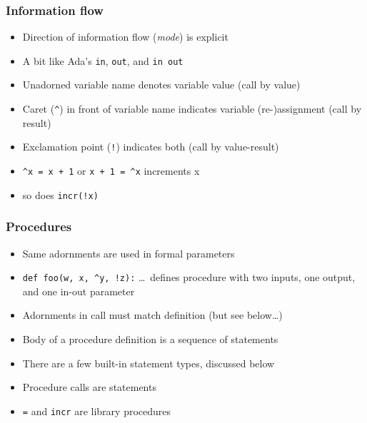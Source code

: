 \documentclass[12pt]{beamer}
\begin{document}
\begin{frame}
\frametitle{Information flow}
\begin{itemize}
\item Direction of information flow (\emph{mode}) is explicit
\item A bit like Ada's \texttt{in}, \texttt{out}, and \texttt{in out}
\item Unadorned variable name denotes variable value (call by value)
\item Caret (\texttt{\^}) in front of variable name indicates
  variable (re-)assignment (call by result)
\item Exclamation point (\texttt{!}) indicates both (call by value-result)
\item \texttt{\^{ }x = x + 1} or \texttt{x + 1 = \^{ }x} increments x
\item so does \texttt{incr(!x)}
\end{itemize}
\end{frame}


\begin{frame}
\frametitle{Procedures}
\begin{itemize}
\item Same adornments are used in formal parameters
\item \texttt{def foo(w, x, \^{ }y, !z):} \ldots\ defines procedure with two
  inputs, one output, and one in-out parameter
\item Adornments in call must match definition (but see below\ldots)
\item Body of a procedure definition is a sequence of
  statements
\item There are a few built-in statement types, discussed below
\item Procedure calls are statements
\item \texttt{=} and \texttt{incr} are library procedures
\end{itemize}
\end{frame}
\end{document}
